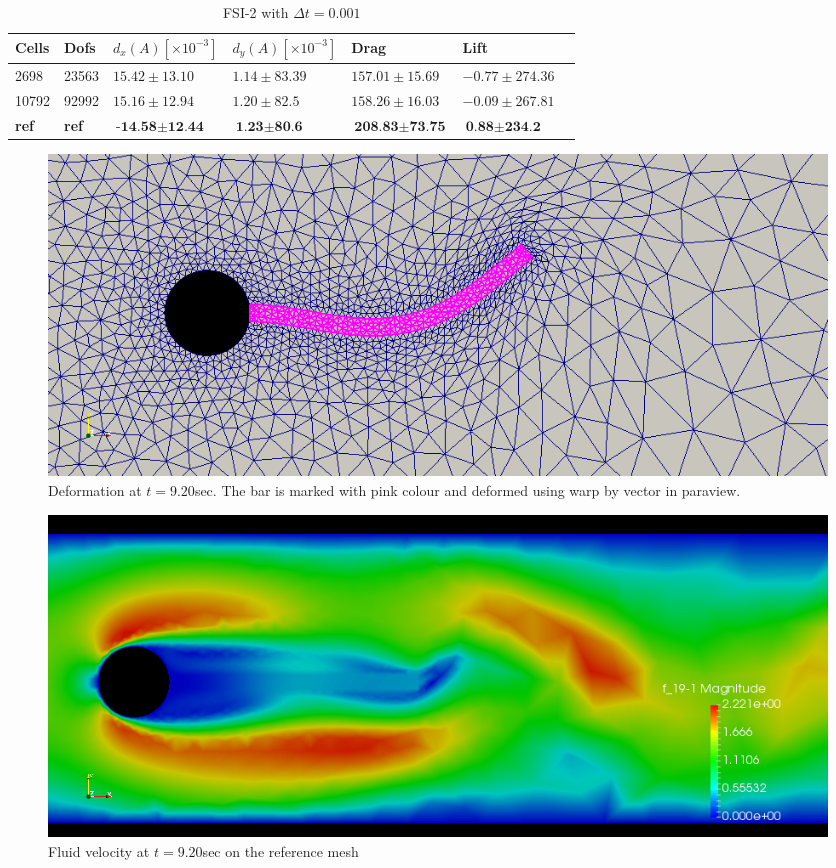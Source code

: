 \begin{table}[H]
\centering
\caption{FSI-2 with $\Delta t = 0.001$}
\label{my-label}
\begin{tabular}{|l|l|l|l|l|l|l|}
\hline
Cells & Dofs & $d_x(A) [\times10^{-3}]$ & $d_y(A) [\times10^{-3}]$ & Drag & Lift  \\ \hline
2698 & 23563 & $ 15.42 \pm 13.10$ & $1.14 \pm 83.39$ & $157.01 \pm 15.69$ & $ -0.77 \pm 274.36$  \\ \hline
10792 & 92992 & $ 15.16 \pm 12.94$ & $ 1.20 \pm 82.5 $ & $ 158.26 \pm 16.03$ & $ -0.09 \pm 267.81$  \\ \hline
\textbf{ref} & \textbf{ref} & $\textbf{-14.58} \pm \textbf{12.44}$ & $\textbf{1.23} \pm \textbf{80.6}$ & $\textbf{208.83} \pm \textbf{73.75}  $ & $\textbf{0.88} \pm \textbf{234.2} $ \\ \hline
\end{tabular}
\end{table}

\begin{figure}[H]
\includegraphics[scale=0.40,trim={0mm 0mm 0mm 0mm},clip]{./Verification_Validation/Hron_Turek/FSI2_d_920.png}
\caption{Deformation at $t =9.20 $sec. The bar is marked with pink colour and deformed using warp by vector in paraview.}
\end{figure}
\begin{figure}[H]
\includegraphics[scale=0.40,trim={0mm 0mm 0mm 0mm},clip]{./Verification_Validation/Hron_Turek/FSI2_u_920.png}
\caption{Fluid velocity at $ t = 9.20 $sec on the reference mesh}
\end{figure}

